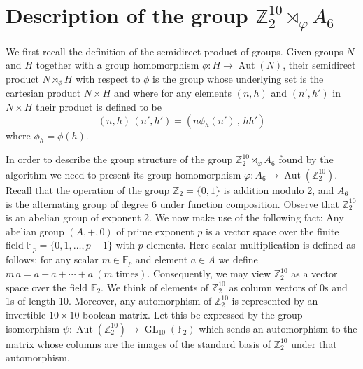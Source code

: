 \documentclass[11pt,twoside]{amsart}
\DeclareMathOperator{\Aut}{Aut}
\DeclareMathOperator{\GL}{GL}
\newcommand{\Z}{\mathbb{Z}}
\newcommand{\F}{\mathbb{F}}
\numberwithin{equation}{section}
\begin{document}
\section{Description of the group $\Z_2^{10} \rtimes_\varphi A_6$}

We first recall the definition of the semidirect product of groups. Given groups $N$ and $H$ together with a group homomorphism $\phi:H\to \Aut(N)$, their semidirect product $N\rtimes_\phi H$ with respect to $\phi$ is the group whose underlying set is the cartesian product $N\times H$ and where for any elements $(n,h)$ and $(n',h')$ in $N\times H$ their product is defined to be
$$(n,h)\,(n',h')=(n\phi_h(n')\,,\,hh')$$
where $\phi_h=\phi(h)$.

In order to describe the group structure of the group $\mathbb{Z}_2^{10} \rtimes_\varphi A_6$ found by the algorithm we need to present its group homomorphism $\varphi:A_6 \to \Aut(\Z_2^{10})$. Recall that the operation of the group $\Z_2=\{0,1\}$ is addition modulo 2, and $A_6$ is the alternating group of degree 6 under function composition.  Observe that $\Z_2^{10}$ is an abelian group of exponent $2$. We now make use of the following fact: Any abelian group $(A,+,0)$ of prime exponent $p$ is a vector space over the finite field $\F_p=\{0,1,\ldots,p-1\}$ with $p$ elements. Here scalar multiplication is defined as follows: for any scalar $m\in\F_p$ and element $a\in A$ we define $m \, a=a+a+\cdots +a ~(m \text{ times})$. Consequently, we may view $\Z_2^{10}$ as a vector space over the field $\F_2$. We think of elements of $\Z_2^{10}$ as column vectors of 0s and 1s of length 10. Moreover, any automorphism of $\Z_2^{10}$ is represented by an invertible $10\times 10$ boolean matrix. Let this be expressed by the group isomorphism $\psi:\Aut(\Z_2^{10})\to \GL_{10}(\mathbb{F}_2)$ which sends an automorphism to the matrix whose columns are the images of the standard basis of $\Z_2^{10}$ under that automorphism. 
\end{document}
